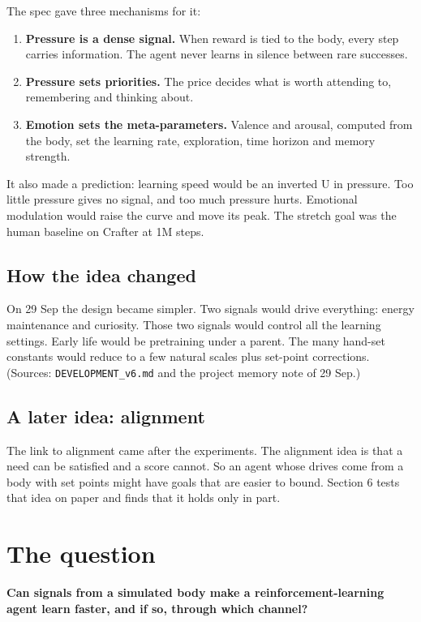 \documentclass[11pt]{article}
\begin{document}
The spec gave three mechanisms for it:

\begin{enumerate}
\item \textbf{Pressure is a dense signal.} When reward is tied to the body, every step carries information. The agent never learns in silence between rare successes.
\item \textbf{Pressure sets priorities.} The price decides what is worth attending to, remembering and thinking about.
\item \textbf{Emotion sets the meta-parameters.} Valence and arousal, computed from the body, set the learning rate, exploration, time horizon and memory strength.
\end{enumerate}

It also made a prediction: learning speed would be an inverted U in pressure. Too little pressure gives no signal, and too much pressure hurts. Emotional modulation would raise the curve and move its peak. The stretch goal was the human baseline on Crafter at 1M steps.

\subsection{How the idea changed}

On 29 Sep the design became simpler. Two signals would drive everything: energy maintenance and curiosity. Those two signals would control all the learning settings. Early life would be pretraining under a parent. The many hand-set constants would reduce to a few natural scales plus set-point corrections. (Sources: \texttt{DEVELOPMENT\_v6.md} and the project memory note of 29 Sep.)

\subsection{A later idea: alignment}

The link to alignment came after the experiments. The alignment idea is that a need can be satisfied and a score cannot. So an agent whose drives come from a body with set points might have goals that are easier to bound. Section 6 tests that idea on paper and finds that it holds only in part.

\section{The question}

\textbf{Can signals from a simulated body make a reinforcement-learning agent learn faster, and if so, through which channel?}
\end{document}
